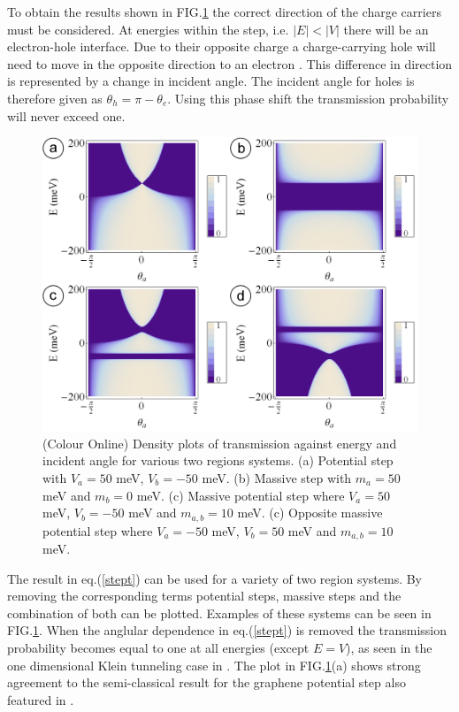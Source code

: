 \documentclass[prl,twocolumn,aps,superscriptaddress,floatfix,10pt]{revtex4}
\begin{document}
	To obtain the results shown in FIG.\ref{step-t-flat} the correct direction of the charge carriers must be considered. At energies within the step, i.e. $|E|<|V|$ there will be an electron-hole interface. Due to their opposite charge a charge-carrying hole will need to move in the opposite direction to an electron \cite{d3}. This difference in direction is represented by a change in incident angle. The incident angle for holes is therefore given as $\theta_{h}=\pi-\theta_{e}$. Using this phase shift the transmission probability will never exceed one.
\begin{figure}
	\includegraphics[scale=0.2]{step-t-flat-2}
	\caption{(Colour Online) Density plots of transmission against energy and incident angle for various two regions systems. (a) Potential step with $V_{a}=50$ meV, $V_{b}=-50$ meV. (b) Massive step with $m_{a}=50$ meV and $m_{b}=0$ meV. (c) Massive potential step where $V_{a}=50$ meV, $V_{b}=-50$ meV and $m_{a,b}=10$ meV. (c) Opposite massive potential step where $V_{a}=-50$ meV, $V_{b}=50$ meV and $m_{a,b}=10$ meV.}
	\label{step-t-flat}
\end{figure}

	The result in eq.(\ref{stept}) can be used for a variety of two region systems. By removing the corresponding terms potential steps, massive steps and the combination of both can be plotted. Examples of these systems can be seen in FIG.\ref{step-t-flat}. When the anglular dependence in eq.(\ref{stept}) is removed the transmission probability becomes equal to one at all energies (except $E=V$), as seen in the one dimensional Klein tunneling case in \cite{d3}. The plot in FIG.\ref{step-t-flat}(a) shows strong agreement to the semi-classical result for the graphene potential step also featured in \cite{d3}.
\end{document}
